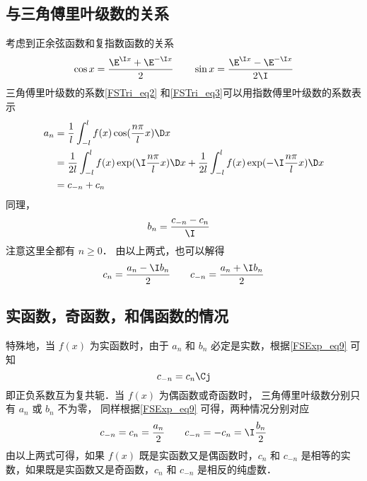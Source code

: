 \subsection{与三角傅里叶级数的关系}
考虑到正余弦函数和复指数函数的关系
\begin{equation}
\cos x = \frac{\E^{\I x} + \E^{-\I x}}{2} \qquad
\sin x = \frac{\E^{\I x} - \E^{-\I x}}{2\I}
\end{equation}
三角傅里叶级数的系数\autoref{FSTri_eq2} 和\autoref{FSTri_eq3}可以用指数傅里叶级数的系数表示
\begin{equation}
\begin{aligned}
{a_n} &= \frac{1}{l}\int_{ - l}^l {f( x )\cos (\frac{{n\pi }}{l}x)\D x}\\
&=  \frac{1}{2l}\int_{ - l}^l {f( x )\exp(\I\frac{{n\pi }}{l}x) \D x} + \frac{1}{2l}\int_{ - l}^l {f( x )\exp(-\I\frac{{n\pi }}{l}x) \D x} \\
&= {c_{-n} + c_n}
\end{aligned}\end{equation}
同理，
\begin{equation}
\begin{aligned}
{b_n} &= \frac{c_{-n}-c_n}{\I}
\end{aligned}\end{equation}
注意这里全都有 $n\ge 0$． 由以上两式，也可以解得
\begin{equation}\label{FSExp_eq9}
c_n = \frac{a_n - \I b_n}{2} \qquad
c_{-n} = \frac{a_n + \I b_n}{2}
\end{equation}

\subsection{实函数，奇函数，和偶函数的情况}
特殊地，当 $f(x)$ 为实函数时，由于 $a_n$ 和 $b_n$ 必定是实数，根据\autoref{FSExp_eq9} 可知
\begin{equation}
c_{-n} = c_{n}\Cj
\end{equation}
即正负系数互为复共轭．当 $f(x)$ 为偶函数或奇函数时， 三角傅里叶级数分别只有 $a_n$ 或 $b_n$ 不为零， 同样根据\autoref{FSExp_eq9} 可得，两种情况分别对应
\begin{equation}
c_{-n} = c_n =\frac{a_n}{2} \qquad
c_{-n} = -c_n = \I \frac{b_n}{2}
\end{equation}
由以上两式可得，如果 $f(x)$ 既是实函数又是偶函数时，$c_n$ 和 $c_{-n}$ 是相等的实数，如果既是实函数又是奇函数，$c_n$ 和 $c_{-n}$ 是相反的纯虚数．


































